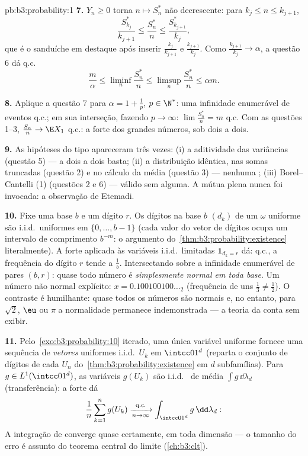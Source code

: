 \begin{solution}{pb:b3:probability:1}
\textbf{7.} $Y_n \geq 0$ torna $n \mapsto S^*_n$
não decrescente: para $k_j \leq n \leq k_{j+1}$,
\[
\frac{S^*_{k_j}}{k_{j+1}} \leq \frac{S^*_n}{n} \leq
\frac{S^*_{k_{j+1}}}{k_j},
\]
que é o sanduíche em destaque após inserir
$\frac{k_j}{k_{j+1}}$ e $\frac{k_{j+1}}{k_j}$. Como
$\frac{k_{j+1}}{k_j} \to \alpha$, a questão 6 dá q.c.
\[
\frac m\alpha \leq \liminf_n\frac{S^*_n}n \leq
\limsup_n\frac{S^*_n}n \leq \alpha m .
\]

\textbf{8.} Aplique a questão 7 para $\alpha = 1 + \frac1p$, $p
\in \N^*$: uma infinidade enumerável de eventos q.c.; em sua
interseção, fazendo $p \to \infty$: $\lim\frac{S^*_n}n =
m$ q.c. Com as questões 1--3, $\frac{S_n}n \to \E X_1$
q.c.: a  forte dos grandes números, sob 
dois a dois.

\textbf{9.} As hipóteses do tipo  apareceram três
vezes: (i) a aditividade das variâncias (questão 5) ---
a  dois a dois basta; (ii) a distribuição idêntica, nas
somas truncadas (questão 2) e no cálculo da média
(questão 3) --- nenhuma ; (iii)
Borel--Cantelli (1) (questões 2 e 6) --- válido sem
 alguma. A  mútua plena nunca foi
invocada: a observação de Etemadi.

\textbf{10.} Fixe uma base $b$ e um dígito $r$. Os dígitos na base
$b$ $(d_k)$ de um $\omega$ uniforme são i.i.d.\ uniformes em
$\{0, \dots, b-1\}$ (cada valor do vetor de dígitos ocupa um
intervalo de comprimento $b^{-m}$: o argumento do~\cref{thm:b3:probability:existence} literalmente). A  forte
aplicada às variáveis i.i.d.\ limitadas $\mathbf
1_{d_k = r}$ dá: q.c., a frequência do dígito $r$
tende a $\frac1b$. Intersectando sobre a infinidade enumerável de
pares $(b, r)$: quase todo número é
\emph{simplesmente normal em toda base}. Um número não normal
explícito: $x = 0.100100100\ldots_2$ (frequência de uns
$\frac13 \neq \frac12$). O contraste é humilhante: quase
todos os números são normais e, no entanto, para $\sqrt2$, $\eu$ ou $\pi$
a normalidade permanece indemonstrada --- a teoria da  conta
sem exibir.

\textbf{11.} Pelo~\cref{exo:b3:probability:10} iterado, uma
única variável uniforme fornece uma sequência de \emph{vetores}
uniformes i.i.d.\ $U_k$ em $\intcc01^d$ (reparta o
conjunto de dígitos de cada $U_n$ do~\cref{thm:b3:probability:existence} em $d$ subfamílias).
Para $g \in L^1(\intcc01^d)$, as variáveis $g(U_k)$ são
i.i.d.\  de média $\int g\,\dd\lambda_d$
(transferência): a  forte dá
\[
\frac1n\sum_{k=1}^ng(U_k)
\xrightarrow[n\to\infty]{\text{q.c.}}
\int_{\intcc01^d}g\,\dd\lambda_d :
\]
A integração de  converge quase certamente, em toda
dimensão --- o tamanho do erro é assunto do teorema
central do limite (\cref{ch:b3:clt}).


\end{solution}
